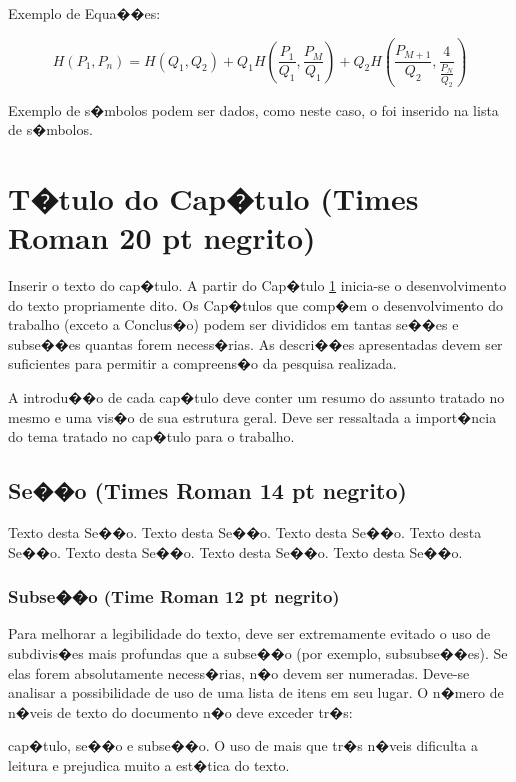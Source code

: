 \documentclass[msc, oneside]{ppgiathesis}
\begin{document}
Exemplo de Equa��es:

\begin{equation}
  H(P_1,P_n)=H(Q_1,Q_2)+Q_1H(\frac{P_1}{Q_1},\frac{P_M}{Q_1})+Q_2H(\frac{P_{M+1}}{Q_2},\frac{4}{\frac{P_N}{Q_2}})
\end{equation}


Exemplo de s�mbolos podem ser dados, como neste caso, o
 foi inserido na lista de
s�mbolos.

\chapter{T�tulo do Cap�tulo (Times Roman 20 pt negrito)}\label{cap_2}

Inserir o texto do cap�tulo. A partir do Cap�tulo \ref{cap_2}
inicia-se o desenvolvimento do texto propriamente dito. Os
Cap�tulos que comp�em o desenvolvimento do trabalho (exceto a
Conclus�o) podem ser divididos em tantas se��es e subse��es
quantas forem necess�rias. As descri��es apresentadas devem ser
suficientes para permitir a compreens�o da pesquisa realizada.

A introdu��o de cada cap�tulo deve conter um resumo do assunto
tratado no mesmo e uma vis�o de sua estrutura geral. Deve ser
ressaltada a import�ncia do tema tratado no cap�tulo para o
trabalho.

\section{Se��o (Times Roman 14 pt negrito)}

Texto desta Se��o. Texto desta Se��o. Texto desta Se��o. Texto
desta Se��o. Texto desta Se��o. Texto desta Se��o. Texto desta
Se��o.

\subsection{Subse��o (Time Roman 12 pt negrito)}

Para melhorar a legibilidade do texto, deve ser extremamente
evitado o uso de subdivis�es mais profundas que a subse��o (por
exemplo, subsubse��es). Se elas forem absolutamente necess�rias,
n�o devem ser numeradas. Deve-se analisar a possibilidade de uso
de uma lista de itens em seu lugar. O n�mero de n�veis de texto do
documento n�o deve exceder tr�s:

cap�tulo, se��o e subse��o. O uso de mais que tr�s n�veis
dificulta a leitura e prejudica muito a est�tica do texto.
\end{document}
